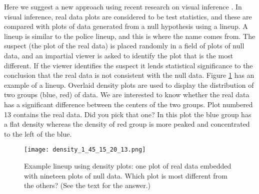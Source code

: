 

Here we suggest a new approach using recent research on visual
inference \citep{buja:2009,wickham:2010}. In visual inference, real
data plots are considered to be test statistics, and these are
compared with plots of data generated from a null hypothesis using a
lineup. A lineup is similar to the police lineup, and this is where
the name comes from. The suspect (the plot of the real data) is placed
randomly in a field of plots of null data, and an impartial viewer is
asked to identify the plot that is the most different. If the viewer
identifies the suspect it lends statistical significance to the
conclusion that the real data is not consistent with the null
data. Figure \ref{lineup} has an example of a lineup. Overlaid density
plots are used to display the distribution of two groups (blue, red)
of data. We are interested to know whether the real data has a
significant difference between the centers of the two groups. Plot
numbered 13 contains the real data. Did you pick that one? In this
plot the blue group has a flat density whereas the density of red
group is more peaked and concentrated to the left of the blue.

\begin{figure}[htbp]
   \centering
   \texttt{[image: density\_1\_45\_15\_20\_13.png]} 
   \caption{Example lineup using density plots: one plot of real data
     embedded with nineteen plots of null data. Which plot is
     most different from the others? (See the text for the answer.)}
   \label{lineup}
\end{figure}

